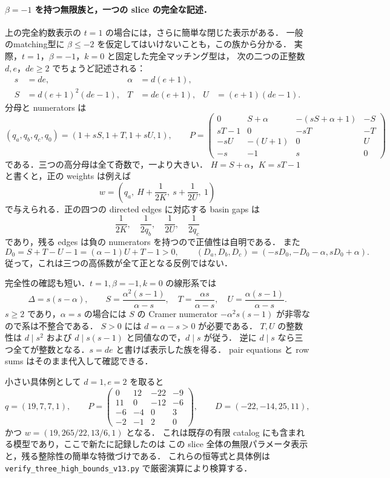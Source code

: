 \paragraph{$\beta=-1$ を持つ無限族と，一つの slice の完全な記述．}
\label{sch13:beta-minus-one}
上の完全約数表示の $t=1$ の場合には，さらに簡単な閉じた表示がある．
一般のmatching型に $\beta\leq-2$ を仮定してはいけないことも，この族から分かる．
実際，$t=1$，$\beta=-1$，$k=0$ と固定した完全マッチング型は，
次の二つの正整数 $d,e$，$de\geq2$ でちょうど記述される：
\begin{align*}
 s&=de,&\alpha&=d(e+1),\\
 S&=d(e+1)^2(de-1),&
 T&=de(e+1),&
 U&=(e+1)(de-1).
\end{align*}
分母と numerators は
\[
 (q_a,q_b,q_c,q_0)=(1+sS,1+T,1+sU,1),
 \qquad
 P=\begin{pmatrix}
 0&S+\alpha&-(sS+\alpha+1)&-S\\
 sT-1&0&-sT&-T\\
 -sU&-(U+1)&0&U\\
 -s&-1&s&0
 \end{pmatrix}
\]
である．三つの高分母は全て奇数で，一より大きい．
$H=S+\alpha$，$K=sT-1$ と書くと，正の weights は例えば
\[
 w=\left(q_a,\ H+\frac1{2K},\ s+\frac1{2U},\ 1\right)
\]
で与えられる．正の四つの directed edges に対応する basin gaps は
\[
 \frac1{2K},\quad\frac1{2q_b},\quad\frac1{2U},\quad\frac1{2q_c}
\]
であり，残る edges は負の numerators を持つので正値性は自明である．
また
\[
 D_0=S+T-U-1=(\alpha-1)U+T-1>0,
 \qquad
 (D_a,D_b,D_c)=(-sD_0,-D_0-\alpha,sD_0+\alpha).
\]
従って，これは三つの高係数が全て正となる反例ではない．

完全性の確認も短い．$t=1,\beta=-1,k=0$ の線形系では
\[
 \Delta=s(s-\alpha),\qquad
 S=\frac{\alpha^2(s-1)}{\alpha-s},\quad
 T=\frac{\alpha s}{\alpha-s},\quad
 U=\frac{\alpha(s-1)}{\alpha-s}.
\]
$s\geq2$ であり，$\alpha=s$ の場合には $S$ の Cramer numerator
$-\alpha^2s(s-1)$ が非零なので系は不整合である．
$S>0$ には $d=\alpha-s>0$ が必要である．
$T,U$ の整数性は $d\mid s^2$ および $d\mid s(s-1)$ と同値なので，$d\mid s$ が従う．
逆に $d\mid s$ なら三つ全てが整数となる．$s=de$ と書けば表示した族を得る．
pair equations と row sums はそのまま代入して確認できる．

小さい具体例として $d=1,e=2$ を取ると
\[
 q=(19,7,7,1),\qquad
 P=\begin{pmatrix}
 0&12&-22&-9\\
 11&0&-12&-6\\
 -6&-4&0&3\\
 -2&-1&2&0
 \end{pmatrix},\qquad
 D=(-22,-14,25,11),
\]
かつ $w=(19,265/22,13/6,1)$ となる．
これは既存の有限 catalog にも含まれる模型であり，ここで新たに記録したのは
この slice 全体の無限パラメータ表示と，残る整除性の簡単な特徴づけである．
これらの恒等式と具体例は \texttt{verify\_three\_high\_bounds\_v13.py} で厳密演算により検算する．
